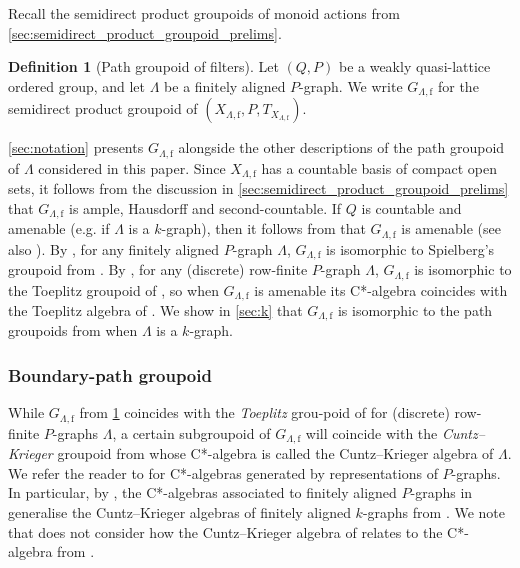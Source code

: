 \documentclass[11pt]{amsart}
\theoremstyle{definition}
\numberwithin{thm}{section}
\numberwithin{equation}{section}
\newtheorem{definition}[thm]{Definition}
\newcommand{\emphasis}[1]{\textit{#1}}
\newcommand{\F}{\mathrm{f}}
\newcommand{\PS}[2]{X_{#2, #1}}
\newcommand{\PG}[2]{{G_{#2, #1}}}
\begin{document}
Recall the semidirect product groupoids of monoid actions from \cref{sec:semidirect_product_groupoid_prelims}.

\begin{definition}[Path groupoid of filters]
\label{def:PGfilter}
Let $(Q, P)$ be a weakly quasi-lattice ordered group, and let $\Lambda$ be a finitely aligned $P$-graph.
We write $\PG{\F}{\Lambda}$ for the semidirect product groupoid of $(\PS{\F}{\Lambda}, P, T_{\PS{\F}{\Lambda}})$.
\end{definition}

\cref{sec:notation} presents $\PG{\F}{\Lambda}$ alongside the other descriptions of the path groupoid of $\Lambda$ considered in this paper.
Since $\PS{\F}{\Lambda}$ has a countable basis of compact open sets, it follows from the discussion in \cref{sec:semidirect_product_groupoid_prelims} that $\PG{\F}{\Lambda}$ is ample, Hausdorff and second-countable. 
If $Q$ is countable and amenable (e.g. if $\Lambda$ is a $k$-graph), then it follows from \cite[Theorem 5.13]{RW17} that $\PG{\F}{\Lambda}$ is amenable (see also \cite[\S 5.4]{Jon26}).
By \cite[Theorem 6.6]{Jon26}, for any finitely aligned $P$-graph $\Lambda$, $\PG{\F}{\Lambda}$ is isomorphic to Spielberg's groupoid from \cite{Spi20}.
By \cite[Remark 6.7]{Jon26}, for any (discrete) row-finite $P$-graph $\Lambda$, $\PG{\F}{\Lambda}$ is isomorphic to the Toeplitz groupoid of \cite[Definition 6.11]{RW17}, so when $\PG{\F}{\Lambda}$ is amenable its C*-algebra coincides with the Toeplitz algebra of 
\cite[Definition 6.11]{RW17}.
We show in \cref{sec:k} that $\PG{\F}{\Lambda}$ is isomorphic to the path groupoids from \cite{FMY05, Yee07} when $\Lambda$ is a $k$-graph.

\subsubsection{Boundary-path groupoid}

While $\PG{\F}{\Lambda}$ from \cref{def:PGfilter} coincides with the \emphasis{Toeplitz} grou-poid of \cite[Definition 6.11]{RW17} for (discrete) row-finite $P$-graphs $\Lambda$, a certain subgroupoid of $\PG{\F}{\Lambda}$ will coincide with the \emphasis{Cuntz--Krieger} groupoid from \cite[Definition 6.18]{RW17} whose C*-algebra is called the Cuntz--Krieger algebra of $\Lambda$.
We refer the reader to \cite{BSV13, arXiv_Hub21, HKLQ24} for C*-algebras generated by representations of $P$-graphs.
In particular, by \cite[Corollary 5.5]{BSV13}, the C*-algebras associated to finitely aligned $P$-graphs in \cite[Theorem 5.3]{BSV13} generalise the Cuntz--Krieger algebras of finitely aligned $k$-graphs from \cite{RSY04}. 
We note that \cite{RW17} does not consider how the Cuntz--Krieger algebra of \cite[Definition 6.18]{RW17} relates to the C*-algebra from \cite[Theorem 5.3]{BSV13}.
\end{document}

